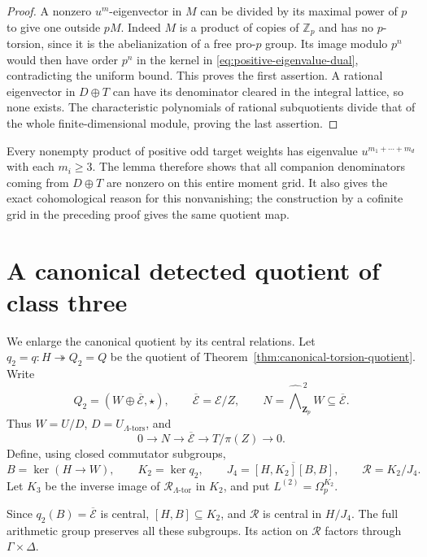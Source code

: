 \documentclass[11pt]{article}
\theoremstyle{definition}\newtheorem{definition}[theorem]{Definition}
\begin{document}
\begin{proof}
A nonzero $u^m$-eigenvector in $M$ can be divided by its
maximal power of $p$ to give one outside $pM$.
Indeed $M$ is a product of copies of $\mathbb Z_p$ and
has no $p$-torsion, since it is the abelianization of
a free pro-$p$ group. Its image modulo $p^n$ would then
have order $p^n$ in the kernel in
\eqref{eq:positive-eigenvalue-dual}, contradicting the
uniform bound. This proves the first assertion.
A rational eigenvector in $D\oplus T$ can have its
denominator cleared in the integral lattice, so none
exists. The characteristic polynomials of rational
subquotients divide that of the whole finite-dimensional
module, proving the last assertion.
\end{proof}

Every nonempty product of positive odd target weights
has eigenvalue $u^{m_1+\cdots+m_d}$ with each $m_i\geq3$.
The lemma therefore shows that all companion denominators
coming from $D\oplus T$ are nonzero on this entire
moment grid. It also gives the exact cohomological reason
for this nonvanishing; the construction by a cofinite
grid in the preceding proof gives the same quotient map.

\section{A canonical detected quotient of class three}
\label{sec:canonical-class-three}

We enlarge the canonical quotient by its central relations.
Let \(q_2=q:H\twoheadrightarrow Q_2=Q\) be the quotient of
Theorem~\ref{thm:canonical-torsion-quotient}. Write
\[
 Q_2=(W\oplus\overline{\mathcal E},\star),\qquad
 \overline{\mathcal E}=\mathcal E/Z,\qquad
 N=\widehat{\bigwedge}^{\,2}_{\mathbf Z_p}W\subseteq\overline{\mathcal E}.
\]
Thus \(W=U/D\), \(D=U_{\Lambda\text{-tors}}\), and
\[
 0\longrightarrow N\longrightarrow\overline{\mathcal E}
 \longrightarrow T/\pi(Z)\longrightarrow0.
\]
Define, using closed commutator subgroups,
\[
 B=\ker(H\to W),\qquad K_2=\ker q_2,\qquad
 J_4=\overline{[H,K_2][B,B]},\qquad
 \mathcal R=K_2/J_4.
\]
Let \(K_3\) be the inverse image of \(\mathcal R_{\Lambda\text{-tor}}\) in \(K_2\), and put \(L^{(2)}=\Omega_p^{K_2}\).

Since \(q_2(B)=\overline{\mathcal E}\) is central,
\([H,B]\subseteq K_2\), and \(\mathcal R\) is central in \(H/J_4\).
The full arithmetic group preserves all these subgroups.
Its action on \(\mathcal R\) factors through \(\Gamma\times\Delta\).
\end{document}
